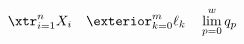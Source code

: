\documentclass[border=3pt]{standalone}
\begin{document}
$\displaystyle
 \xtr_{i = 1}^{n} X_i         \quad
 \exterior_{k = 0}^{m} \ell_k \quad
 \lim_{p = 0}^{w} q_p$
\end{document}
